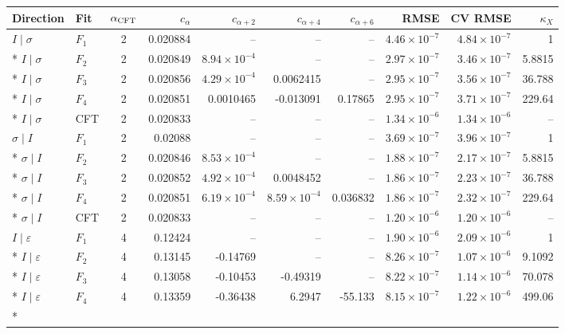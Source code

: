 \begin{longtable}{llcrrrrrrr}\toprule
Direction & Fit & $\alpha_{\rm CFT}$ & $c_\alpha$ & $c_{\alpha+2}$ & $c_{\alpha+4}$ & $c_{\alpha+6}$ & RMSE & CV RMSE & $\kappa_X$\\\midrule\endhead
$I\mid \sigma$ & $F_1$ & 2 & 0.020884 & -- & -- & -- & $4.46\!\times\!10^{-7}$ & $4.84\!\times\!10^{-7}$ & 1 \\*
$I\mid \sigma$ & $F_2$ & 2 & 0.020849 & $8.94\!\times\!10^{-4}$ & -- & -- & $2.97\!\times\!10^{-7}$ & $3.46\!\times\!10^{-7}$ & 5.8815 \\*
$I\mid \sigma$ & $F_3$ & 2 & 0.020856 & $4.29\!\times\!10^{-4}$ & 0.0062415 & -- & $2.95\!\times\!10^{-7}$ & $3.56\!\times\!10^{-7}$ & 36.788 \\*
$I\mid \sigma$ & $F_4$ & 2 & 0.020851 & 0.0010465 & -0.013091 & 0.17865 & $2.95\!\times\!10^{-7}$ & $3.71\!\times\!10^{-7}$ & 229.64 \\*
$I\mid \sigma$ & CFT & 2 & 0.020833 & -- & -- & -- & $1.34\!\times\!10^{-6}$ & $1.34\!\times\!10^{-6}$ & -- \\
\addlinespace[3pt]
$\sigma\mid I$ & $F_1$ & 2 & 0.02088 & -- & -- & -- & $3.69\!\times\!10^{-7}$ & $3.96\!\times\!10^{-7}$ & 1 \\*
$\sigma\mid I$ & $F_2$ & 2 & 0.020846 & $8.53\!\times\!10^{-4}$ & -- & -- & $1.88\!\times\!10^{-7}$ & $2.17\!\times\!10^{-7}$ & 5.8815 \\*
$\sigma\mid I$ & $F_3$ & 2 & 0.020852 & $4.92\!\times\!10^{-4}$ & 0.0048452 & -- & $1.86\!\times\!10^{-7}$ & $2.23\!\times\!10^{-7}$ & 36.788 \\*
$\sigma\mid I$ & $F_4$ & 2 & 0.020851 & $6.19\!\times\!10^{-4}$ & $8.59\!\times\!10^{-4}$ & 0.036832 & $1.86\!\times\!10^{-7}$ & $2.32\!\times\!10^{-7}$ & 229.64 \\*
$\sigma\mid I$ & CFT & 2 & 0.020833 & -- & -- & -- & $1.20\!\times\!10^{-6}$ & $1.20\!\times\!10^{-6}$ & -- \\
\addlinespace[3pt]
$I\mid \varepsilon$ & $F_1$ & 4 & 0.12424 & -- & -- & -- & $1.90\!\times\!10^{-6}$ & $2.09\!\times\!10^{-6}$ & 1 \\*
$I\mid \varepsilon$ & $F_2$ & 4 & 0.13145 & -0.14769 & -- & -- & $8.26\!\times\!10^{-7}$ & $1.07\!\times\!10^{-6}$ & 9.1092 \\*
$I\mid \varepsilon$ & $F_3$ & 4 & 0.13058 & -0.10453 & -0.49319 & -- & $8.22\!\times\!10^{-7}$ & $1.14\!\times\!10^{-6}$ & 70.078 \\*
$I\mid \varepsilon$ & $F_4$ & 4 & 0.13359 & -0.36438 & 6.2947 & -55.133 & $8.15\!\times\!10^{-7}$ & $1.22\!\times\!10^{-6}$ & 499.06 \\*

\end{longtable}
